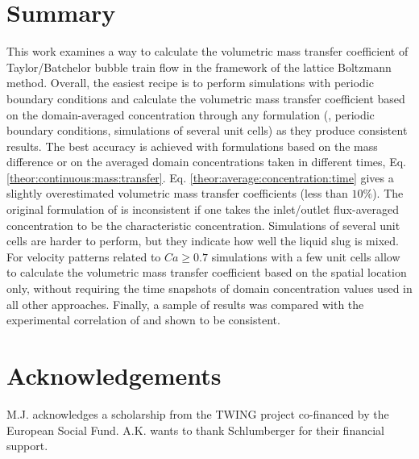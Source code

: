 \documentclass[preprint,12pt]{elsarticle}
\begin{document}
\section{Summary}
This work examines a way to calculate the volumetric mass transfer coefficient of Taylor/Batchelor bubble train flow in the framework of
the lattice Boltzmann method. Overall, the easiest recipe is to perform simulations 
with periodic boundary conditions
and calculate the volumetric mass transfer coefficient based on the
domain-averaged concentration through any formulation (\citeauthor{vanbaten-circular}, periodic boundary conditions, simulations of several unit cells) as they produce consistent results. The best accuracy
is achieved with formulations based on the mass difference or on the averaged domain concentrations
taken in different times, Eq. \ref{theor:continuous:mass:transfer}. Eq.
\ref{theor:average:concentration:time} gives a slightly overestimated volumetric mass transfer
coefficients (less than $10\%$). The original formulation of
\citet{vanbaten-circular} is inconsistent if one takes the inlet/outlet flux-averaged concentration
to be the characteristic concentration. Simulations of several unit cells are harder to perform, but they
indicate how well the liquid slug is mixed.  For velocity patterns related to $Ca\geq
0.7$ simulations with a few unit cells allow to calculate the volumetric mass transfer
coefficient based on the spatial location only, without requiring the time snapshots of domain concentration values used in all other
approaches. Finally, a sample of results was
compared with the experimental correlation of \citet{yue-mass} and shown to be consistent. 

\section{Acknowledgements}
M.J. acknowledges a scholarship from the TWING project co-financed by the European Social Fund. A.K. wants to thank Schlumberger for their financial support.
\end{document}
